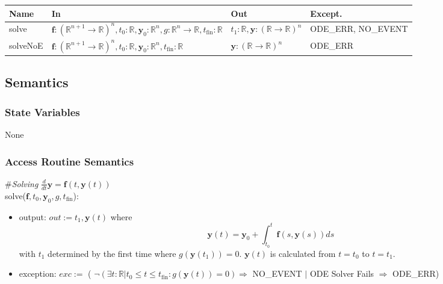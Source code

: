 \documentclass[12pt, titlepage]{article}
\begin{document}
\begin{center}
\begin{tabular}{p{1.5cm} >{\raggedright\arraybackslash}p{9.25cm} >{\raggedright\arraybackslash}p{2.4cm} p{1.5cm}}
  \hline
  \textbf{Name} & \textbf{In} & \textbf{Out} & \textbf{Except.} \\
  \hline
  solve & $\textbf{f}: (\mathbb{R}^{n+1} \rightarrow \mathbb{R})^n, t_0 : \mathbb{R},
          \textbf{y}_0: \mathbb{R}^n, g: \mathbb{R}^n \rightarrow \mathbb{R},
          t_\text{fin}: \mathbb{R}$ & $t_1: \mathbb{R}, 
                                      \textbf{y}:
                                      (\mathbb{R}
                                      \rightarrow
                                      \mathbb{R})^n$ & ODE\_ERR, NO\_EVENT\\
  solveNoE & $\textbf{f}: (\mathbb{R}^{n+1} \rightarrow \mathbb{R})^n, t_0 : \mathbb{R},
             \textbf{y}_0: \mathbb{R}^n, t_\text{fin}: \mathbb{R}$ & $\textbf{y}: (\mathbb{R}
                                                            \rightarrow
                                                            \mathbb{R})^n$ & ODE\_ERR\\

  \hline 
\end{tabular}
\end{center}

\subsection{Semantics}

\subsubsection{State Variables}

None

\subsubsection{Access Routine Semantics}

\#\textit{Solving} $\frac{d}{dt} \mathbf{y} = \mathbf{f}(t,
\mathbf{y}(t))$\\

\noindent solve($\textbf{f}, t_0, \textbf{y}_0, g, t_\text{fin}$): 
\begin{itemize}
\item output: $out := t_1, \textbf{y}(t)$ where 
$$\textbf{y}(t) = \textbf{y}_0 + \int_{t_0}^{t} \textbf{f}(s, \textbf{y}(s)) ds$$ 
with $t_1$ determined by the first time where $g(\textbf{y}(t_1)) = 0$.  $\textbf{y}(t)$ is
calculated from $t = t_0$ to $t = t_1$.
\item exception: $exc :=$ ( $\neg (\exists t: \mathbb{R}| t_0 \leq t
  \leq t_\text{fin} : g(\textbf{y}(t)) = 0) \Rightarrow$ NO\_EVENT $|$ ODE Solver Fails $\Rightarrow$
  ODE\_ERR)
\end{itemize}
\end{document}
